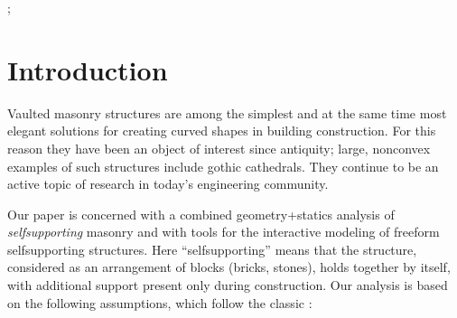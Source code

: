 \documentclass[review]{acmsiggraph}
\begin{document}

\begin{CRcatlist}
  ;
\end{CRcatlist}


\keywordlist


\TOGlinkslist


\copyrightspace



\section{Introduction}


Vaulted masonry structures are among the simplest and at the same time 
most elegant solutions for creating curved shapes in building 
construction. For this reason they have been an object of interest 
since antiquity; large, non\dash convex examples of such structures include gothic 
cathedrals. They continue to be an active topic of research in today's 
engineering community.


Our paper is concerned with a combined geometry+statics analysis of {\em 
self\dash supporting} masonry and with tools for the interactive modeling 
of freeform self\dash supporting structures. Here ``self\dash supporting'' 
means that the structure, considered as an arrangement of blocks (bricks, 
stones), holds together by itself, with additional support present only during 
construction. Our analysis is based on the following assumptions, which follow the classic 
\cite{Heyman66}:
\end{document}

